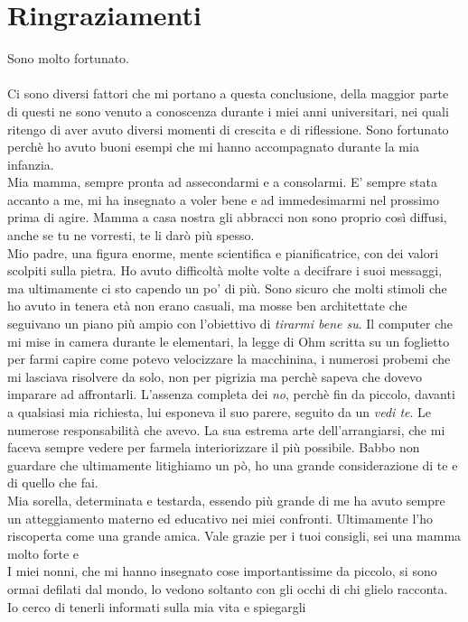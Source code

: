 \chapter{Ringraziamenti}\label{ch:ringraziamenti}
Sono molto fortunato.\\\\
 Ci sono diversi fattori che mi portano a questa conclusione, della maggior parte di questi
ne sono venuto a conoscenza durante i miei anni universitari, nei quali ritengo di aver avuto diversi momenti di crescita
e di riflessione.
Sono fortunato perchè ho avuto buoni esempi che mi hanno accompagnato durante la mia infanzia.
\\Mia mamma, sempre pronta ad assecondarmi e a consolarmi. E' sempre stata accanto a me, mi ha insegnato a voler bene e ad immedesimarmi nel prossimo prima di agire.
Mamma a casa nostra gli abbracci non sono proprio così diffusi, anche se tu ne vorresti, te li darò più spesso.
\\Mio padre, una figura enorme, mente scientifica e pianificatrice, con dei valori scolpiti sulla pietra. Ho avuto difficoltà molte volte a decifrare i suoi messaggi,
ma ultimamente ci sto capendo un po' di più. Sono sicuro che molti stimoli che ho avuto in tenera età non erano casuali, ma mosse ben architettate
che seguivano un piano più ampio con l'obiettivo di \emph{tirarmi bene su}. Il computer che mi mise in camera durante le elementari, la legge di Ohm scritta su un foglietto per farmi capire 
come potevo velocizzare la macchinina, i numerosi probemi che mi lasciava risolvere da solo, non per pigrizia ma perchè sapeva che dovevo imparare ad affrontarli.
 L'assenza completa dei \emph{no}, perchè fin da piccolo, davanti a qualsiasi mia richiesta, lui esponeva il suo parere, seguito da un \emph{vedi te}.
Le numerose responsabilità che avevo. La sua estrema arte dell'arrangiarsi, che mi faceva sempre vedere per farmela interiorizzare il più possibile.
Babbo non guardare che ultimamente litighiamo un pò, ho una grande considerazione di te e di quello che fai.
\\Mia sorella, determinata e testarda, essendo più grande di me ha avuto sempre un atteggiamento materno ed educativo nei miei confronti. 
Ultimamente l'ho riscoperta come una grande amica.
Vale grazie per i tuoi consigli, sei una mamma molto forte e
\\
I miei nonni, che mi hanno insegnato cose importantissime da piccolo, si sono ormai defilati dal mondo,
lo vedono soltanto con gli occhi di chi glielo racconta. Io cerco di tenerli informati sulla mia vita e spiegargli
